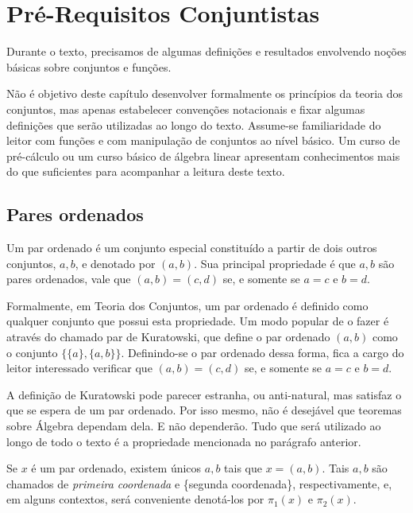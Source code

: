 
\chapter{Pré-Requisitos Conjuntistas}
Durante o texto, precisamos de algumas definições e resultados envolvendo noções básicas sobre conjuntos e funções.

Não é objetivo deste capítulo desenvolver formalmente os princípios da teoria dos conjuntos, mas apenas estabelecer convenções notacionais e fixar algumas definições que serão utilizadas ao longo do texto. Assume-se familiaridade do leitor com funções e com manipulação de conjuntos ao nível básico.
Um curso de pré-cálculo ou um curso básico de álgebra linear apresentam conhecimentos mais do que suficientes para acompanhar a leitura deste texto.

\section{Pares ordenados}
Um par ordenado é um conjunto especial constituído a partir de dois outros conjuntos, $a, b$, e denotado por $(a, b)$.
Sua principal propriedade é que $a, b$ são pares ordenados, vale que $(a, b)=(c, d)$ se, e somente se $a=c$ e $b=d$.

Formalmente, em Teoria dos Conjuntos, um par ordenado é definido como qualquer conjunto que possui esta propriedade.
Um modo popular de o fazer é através do chamado par de Kuratowski, que define o par ordenado $(a, b)$ como o conjunto $\{\{a\}, \{a, b\}\}$.
Definindo-se o par ordenado dessa forma, fica a cargo do leitor interessado verificar que $(a, b)=(c, d)$ se, e somente se $a=c$ e $b=d$.

A definição de Kuratowski pode parecer estranha, ou anti-natural, mas satisfaz o que se espera de um par ordenado.
Por isso mesmo, não é desejável que teoremas sobre Álgebra dependam dela. E não dependerão. Tudo que será utilizado ao longo de todo o texto é a propriedade mencionada no parágrafo anterior.

Se $x$ é um par ordenado, existem únicos $a, b$ tais que $x=(a, b)$.
Tais $a, b$ são chamados de \emph{primeira coordenada} e \{segunda coordenada\}, respectivamente, e, em alguns contextos, será conveniente denotá-los por $\pi_1(x)$ e $\pi_2(x)$.

